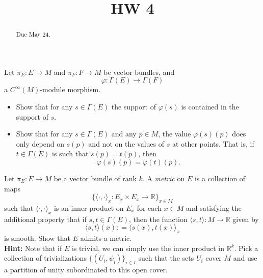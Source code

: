 \documentclass{ximera}
\title{HW 4}
\begin{document}
    \begin{abstract}  Due May 24.  \end{abstract}
    \maketitle



\begin{exercise}
    Let $\pi _E : E \to M$ and $\pi _F : F \to M$ be vector bundles, and 
    \[ \varphi : \Gamma (E) \to \Gamma (F)  \] 
    a  $C^{\infty}(M)$-module morphism.
    \begin{itemize}
        \item Show that for any $s \in \Gamma (E)$ the support of $\varphi (s) $ is contained in the support of $s$.  
        \item Show that for any $s \in \Gamma (E)$ and any $p \in M$, the value $\varphi (s) (p) $ does only depend on $s (p)$ and not on the values of $s$ at other points. That is, if $t \in \Gamma (E)$ is such that $s (p) = t(p)$, then 
    \[     \varphi (s) (p) = \varphi (t) (p)  .                     \]
    \end{itemize}
\end{exercise}

\begin{exercise}
    Let $\pi _E : E \to M$ be a  vector bundle of rank $k$. A \emph{metric} on $E$ is a collection of maps
    \[    \{  \langle \cdot , \cdot \rangle _x : E_x \times E_x \to \mathbb{R} \} _{x \in M}            \]
    such that $\langle \cdot , \cdot \rangle _x$ is an inner product on $E_x$ for each $x \in M$ and satisfying the additional property that if $s ,t  \in \Gamma (E)$, then the function  $\langle s , t \rangle : M \to \mathbb{R}$  given by 
    \[    \langle s, t\rangle (x) : = \langle s(x) , t(x) \rangle _x       \]
    is smooth. Show that $E$ admits a metric. \\

    
    \textbf{Hint:  }Note that if $E$ is trivial, we can simply use the inner product in $\mathbb{R}^k$.  Pick a collection of trivializations $\{ (U_i , \psi _i ) \} _{i \in I}$ such that the sets $U_i$ cover $M$ and use a partition of unity subordinated to this open cover. 

\end{exercise}
\end{document}

